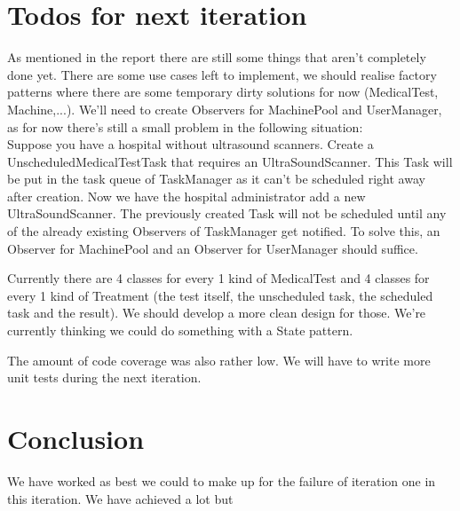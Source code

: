 \documentclass[11pt]{article}
\begin{document}
\section{Todos for next iteration}
As mentioned in the report there are still some things that aren't completely done yet. There are some use cases left to implement, we should realise factory patterns where there are some temporary dirty solutions for now (MedicalTest, Machine,...). We'll need to create Observers for MachinePool and UserManager, as for now there's still a small problem in the following situation:
\\Suppose you have a hospital without ultrasound scanners. Create a UnscheduledMedicalTestTask that requires an UltraSoundScanner. This Task will be put in the task queue of TaskManager as it can't be scheduled right away after creation. Now we have the hospital administrator add a new UltraSoundScanner. The previously created Task will not be scheduled until any of the already existing Observers of TaskManager get notified. To solve this, an Observer for MachinePool and an Observer for UserManager should suffice.

Currently there are 4 classes for every 1 kind of MedicalTest and 4 classes for every 1 kind of Treatment (the test itself, the unscheduled task, the scheduled task and the result). We should develop a more clean design for those. We're currently thinking we could do something with a State pattern.

The amount of code coverage was also rather low. We will have to write more unit tests during the next iteration.

\section{Conclusion}
We have worked as best we could to make up for the failure of iteration one in this iteration. We have achieved a lot but 
\pagebreak
\end{document}
